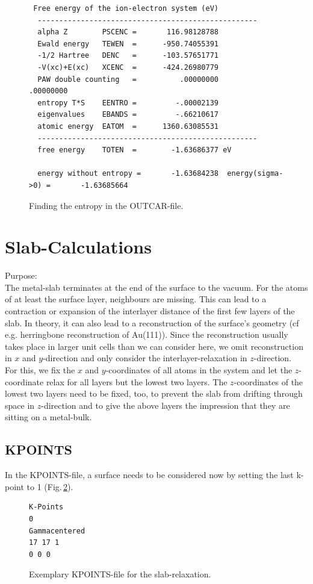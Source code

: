 \documentclass[twoside, 11pt, titlepage, captions=nooneline, a4paper, headsepline]{scrbook}%
\newcommand{\9}{\mathrm}
\newcommand{\0}{\,\mathrm}
\begin{document}
\begin{figure}[h!!]
\begin{verbatim}
 Free energy of the ion-electron system (eV)
  ---------------------------------------------------
  alpha Z        PSCENC =       116.98128788
  Ewald energy   TEWEN  =      -950.74055391
  -1/2 Hartree   DENC   =      -103.57651771
  -V(xc)+E(xc)   XCENC  =      -424.26980779
  PAW double counting   =          .00000000         .00000000
  entropy T*S    EENTRO =         -.00002139
  eigenvalues    EBANDS =         -.66210617
  atomic energy  EATOM  =      1360.63085531
  ---------------------------------------------------
  free energy    TOTEN  =        -1.63686377 eV

  energy without entropy =       -1.63684238  energy(sigma->0) =       -1.63685664  
\end{verbatim}
\caption{Finding the entropy in the OUTCAR-file.}
\label{ent1}
\end{figure}
\section{Slab-Calculations}
\label{slab}
Purpose:\\
The metal-slab terminates at the end of the surface to the vacuum. For the atoms of at least the surface layer, neighbours are missing. This can lead to a contraction or expansion of the interlayer distance of the first few layers of the slab. In theory, it can also lead to a reconstruction of the surface's geometry (cf e.g. herringbone reconstruction of Au(111)). Since the reconstruction usually takes place in larger unit cells than we can consider here, we omit reconstruction in $x$ and $y$-direction and only consider the interlayer-relaxation in $z$-direction.\\
For this, we fix the $x$ and $y$-coordinates of all atoms in the system and let the $z$-coordinate relax for all layers but the lowest two layers. The $z$-coordinates of the lowest two layers need to be fixed, too, to prevent the slab from drifting through space in $z$-direction and to give the above layers the impression that they are sitting on a metal-bulk.
\subsection{KPOINTS}
In the KPOINTS-file, a surface needs to be considered now by setting the last k-point to 1 (Fig.\,\ref{slabkp}).
\begin{figure}[h!!]
\begin{verbatim}
K-Points
0
Gammacentered
17 17 1
0 0 0
\end{verbatim}
\caption{Exemplary KPOINTS-file for the slab-relaxation.}
\label{slabkp}
\end{figure}
\end{document}

